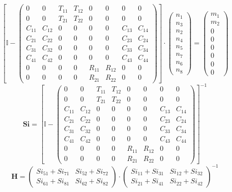 \[ \left[ \mathbb{I}  - \left(\begin{smallmatrix} 0 & 0 & T_{11} &
T_{12} & 0 & 0 & 0 & 0 \\ 0 & 0 & T_{21} & T_{22} & 0 & 0 & 0 & 0 \\
C_{11} & C_{12} & 0 & 0 & 0 & 0 & C_{13} & C_{14} \\ C_{21} & C_{22} &
0 & 0 & 0 & 0 & C_{23} & C_{24} \\ C_{31} & C_{32} & 0 & 0 & 0 & 0 &
C_{33} & C_{34} \\ C_{41} & C_{42} & 0 & 0 & 0 & 0 & C_{43} & C_{44}
\\ 0 & 0 & 0 & 0 & R_{11} & R_{12} & 0 & 0 \\ 0 & 0 & 0 & 0 & R_{21} &
R_{22} & 0 & 0 \end{smallmatrix}\right)\right] \cdot
\left(\begin{smallmatrix} n_{1} \\ n_{3} \\ n_{2} \\ n_{4} \\ n_{5} \\
n_{7} \\ n_{6} \\ n_{8} \end{smallmatrix}\right) =
\left(\begin{smallmatrix} m_{1} \\ m_{2} \\ 0 \\ 0 \\ 0 \\ 0 \\ 0 \\ 0
\end{smallmatrix}\right) \]
\[ \mathbf{Si} = \left[ \mathbb{I}  - \left(\begin{smallmatrix} 0 & 0
& T_{11} & T_{12} & 0 & 0 & 0 & 0 \\ 0 & 0 & T_{21} & T_{22} & 0 & 0 &
0 & 0 \\ C_{11} & C_{12} & 0 & 0 & 0 & 0 & C_{13} & C_{14} \\ C_{21} &
C_{22} & 0 & 0 & 0 & 0 & C_{23} & C_{24} \\ C_{31} & C_{32} & 0 & 0 &
0 & 0 & C_{33} & C_{34} \\ C_{41} & C_{42} & 0 & 0 & 0 & 0 & C_{43} &
C_{44} \\ 0 & 0 & 0 & 0 & R_{11} & R_{12} & 0 & 0 \\ 0 & 0 & 0 & 0 &
R_{21} & R_{22} & 0 & 0 \end{smallmatrix}\right) \right]^{-1} \]
\[ \mathbf{H} = \left(\begin{smallmatrix} Si_{51} + Si_{71} & Si_{52}
+ Si_{72} \\ Si_{61} + Si_{81} & Si_{62} + Si_{82}
\end{smallmatrix}\right)\cdot \left(\begin{smallmatrix} Si_{11} +
Si_{31} & Si_{12} + Si_{32} \\ Si_{21} + Si_{41} & Si_{22} + Si_{42}
\end{smallmatrix}\right)^{-1} \]
